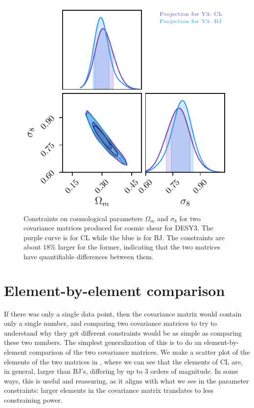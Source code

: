 \documentclass[twocolumn]{\docclass}
\begin{document}
	\begin{figure}
		\includegraphics[width=0.9\columnwidth]{Y3-comparison.pdf}
		\caption{Constraints on cosmological parameters $\Omega_m$ and $\sigma_8$ for two covariance matrices produced for cosmic shear for DESY3. The purple curve is for CL while the blue is for BJ. The constraints are about $18\%$ larger for the former, indicating that the two matrices have quantifiable differences between them. \label{fig:y3-comparison}}
	\end{figure}
	

	
\section{Element-by-element comparison}

	If there was only a single data point, then the covariance matrix would contain only a single number, and comparing two covariance matrices to try to understand why they get different constraints would be as simple as comparing these two numbers. 
The simplest generalization of this is to do an element-by-element comparison of the two covariance matrices.
We make a scatter plot of the elements of the two matrices in , where we can see that the elements of CL are, in general, larger than BJ's, differing by up to 3 orders of magnitude. In some ways, this is useful and reassuring, as it aligns with what we see in the parameter constraints: larger elements in the covariance matrix translates to less constraining power.
	
\end{document}
